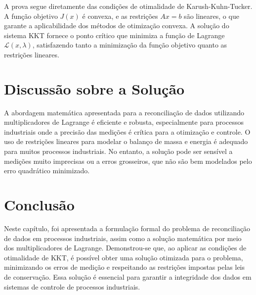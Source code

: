 \begin{prova}
A prova segue diretamente das condições de otimalidade de Karush-Kuhn-Tucker. A função objetivo $J(x)$ é convexa, e as restrições $Ax = b$ são lineares, o que garante a aplicabilidade dos métodos de otimização convexa. A solução do sistema KKT fornece o ponto crítico que minimiza a função de Lagrange $\mathcal{L}(x, \lambda)$, satisfazendo tanto a minimização da função objetivo quanto as restrições lineares.
\end{prova}

\section{Discussão sobre a Solução}
\label{Sec:DiscussaoSolucao}

A abordagem matemática apresentada para a reconciliação de dados utilizando multiplicadores de Lagrange é eficiente e robusta, especialmente para processos industriais onde a precisão das medições é crítica para a otimização e controle. O uso de restrições lineares para modelar o balanço de massa e energia é adequado para muitos processos industriais. No entanto, a solução pode ser sensível a medições muito imprecisas ou a erros grosseiros, que não são bem modelados pelo erro quadrático minimizado.

\section{Conclusão}
\label{Sec:ConclusaoProblema}

Neste capítulo, foi apresentada a formulação formal do problema de reconciliação de dados em processos industriais, assim como a solução matemática por meio dos multiplicadores de Lagrange. Demonstrou-se que, ao aplicar as condições de otimalidade de KKT, é possível obter uma solução otimizada para o problema, minimizando os erros de medição e respeitando as restrições impostas pelas leis de conservação. Essa solução é essencial para garantir a integridade dos dados em sistemas de controle de processos industriais.
